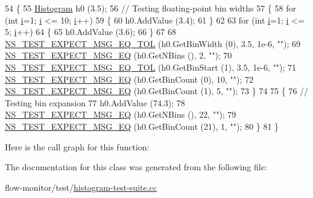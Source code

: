 \begin{DoxyCode}
54 \{
55   \hyperlink{classns3_1_1Histogram}{Histogram} h0 (3.5);
56   \textcolor{comment}{// Testing floating-point bin widths}
57   \{
58     \textcolor{keywordflow}{for} (\textcolor{keywordtype}{int} \hyperlink{bernuolliDistribution_8m_a6f6ccfcf58b31cb6412107d9d5281426}{i}=1; \hyperlink{bernuolliDistribution_8m_a6f6ccfcf58b31cb6412107d9d5281426}{i} <= 10; \hyperlink{bernuolliDistribution_8m_a6f6ccfcf58b31cb6412107d9d5281426}{i}++)
59       \{ 
60         h0.AddValue (3.4);
61       \}
62 
63     \textcolor{keywordflow}{for} (\textcolor{keywordtype}{int} \hyperlink{bernuolliDistribution_8m_a6f6ccfcf58b31cb6412107d9d5281426}{i}=1; \hyperlink{bernuolliDistribution_8m_a6f6ccfcf58b31cb6412107d9d5281426}{i} <= 5; \hyperlink{bernuolliDistribution_8m_a6f6ccfcf58b31cb6412107d9d5281426}{i}++)
64       \{
65         h0.AddValue (3.6);
66       \}
67 
68     \hyperlink{group__testing_ga7927b376d1fed5e576c7a3d69d26e8a0}{NS\_TEST\_EXPECT\_MSG\_EQ\_TOL} (h0.GetBinWidth (0),  3.5, 1e-6, \textcolor{stringliteral}{""});
69     \hyperlink{group__testing_ga7304ba46a28d8cf08dfdfd6499cf7068}{NS\_TEST\_EXPECT\_MSG\_EQ} (h0.GetNBins (),  2, \textcolor{stringliteral}{""});
70     \hyperlink{group__testing_ga7927b376d1fed5e576c7a3d69d26e8a0}{NS\_TEST\_EXPECT\_MSG\_EQ\_TOL} (h0.GetBinStart (1),  3.5, 1e-6, \textcolor{stringliteral}{""});
71     \hyperlink{group__testing_ga7304ba46a28d8cf08dfdfd6499cf7068}{NS\_TEST\_EXPECT\_MSG\_EQ} (h0.GetBinCount (0),  10, \textcolor{stringliteral}{""});
72     \hyperlink{group__testing_ga7304ba46a28d8cf08dfdfd6499cf7068}{NS\_TEST\_EXPECT\_MSG\_EQ} (h0.GetBinCount (1),  5, \textcolor{stringliteral}{""});
73   \}
74 
75   \{
76     \textcolor{comment}{// Testing bin expansion}
77     h0.AddValue (74.3);
78     \hyperlink{group__testing_ga7304ba46a28d8cf08dfdfd6499cf7068}{NS\_TEST\_EXPECT\_MSG\_EQ} (h0.GetNBins (), 22, \textcolor{stringliteral}{""});
79     \hyperlink{group__testing_ga7304ba46a28d8cf08dfdfd6499cf7068}{NS\_TEST\_EXPECT\_MSG\_EQ} (h0.GetBinCount (21), 1, \textcolor{stringliteral}{""});
80   \}
81 \}
\end{DoxyCode}


Here is the call graph for this function\+:




The documentation for this class was generated from the following file\+:\begin{DoxyCompactItemize}
\item 
flow-\/monitor/test/\hyperlink{histogram-test-suite_8cc}{histogram-\/test-\/suite.\+cc}\end{DoxyCompactItemize}
